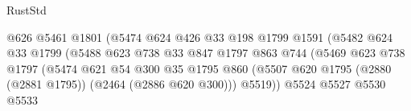 \begin{lexlean}{RustStd}
\begin{coremodule}
                                                @626
                                                @5461
                                                @1801
                                                (@5474
                                                  @624
                                                  @426
                                                  @33
                                                  @198
                                                  @1799
                                                  @1591
                                                  (@5482
                                                    @624
                                                    @33
                                                    @1799
                                                    (@5488
                                                      @623
                                                      @738
                                                      @33
                                                      @847
                                                      @1797
                                                      @863
                                                      @744
                                                      (@5469
                                                        @623
                                                        @738
                                                        @1797
                                                        (@5474
                                                          @621
                                                          @54
                                                          @300
                                                          @35
                                                          @1795
                                                          @860
                                                          (@5507
                                                            @620
                                                            @1795
                                                            (@2880 (@2881 @1795))
                                                            (@2464 (@2886 @620 @300)))
                                                          @5519))
                                                      @5524
                                                      @5527
                                                      @5530
                                                      @5533

\end{coremodule}
\end{lexlean}
